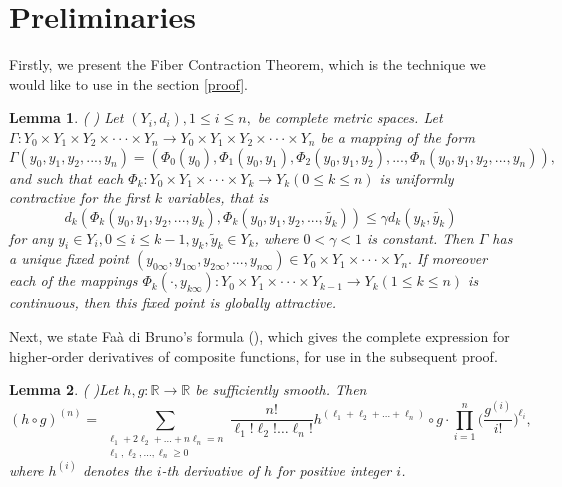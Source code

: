 \documentclass[11pt,reqno,a4paper]{amsart}
\newtheorem{lemma}{Lemma}
\numberwithin{equation}{section}
\begin{document}
\section{Preliminaries}\label{lemma}
Firstly, we present the Fiber Contraction Theorem, which is the technique we would like to use in the section \ref{proof}.




\begin{lemma} ( \!\cite[Fiber Contraction Theorem ]{VA}) \label{fct}
Let $(Y_{i},d_i), 1\le i\le n,$ be complete metric spaces. Let $\Gamma:Y_{0} \times Y_1\times Y_2 \times \cdot\cdot \cdot \times Y_n\rightarrow Y_{0} \times Y_1\times Y_2 \times \cdot\cdot \cdot \times Y_n$ be a mapping of the form 
$$\Gamma(y_0,y_1,y_2,...,y_n)=(\Phi_0(y_0),\Phi_1(y_0,y_1),\Phi_2(y_0,y_1,y_2),...,\Phi_n(y_0,y_1,y_2,...,y_n)), $$ and such that each $\Phi_k: Y_0\times Y_1 \times\cdot\cdot \cdot\times Y_k  \rightarrow Y_k(0\le k \le n)$ is uniformly  contractive for the first $k$ variables, that is
$$d_{k}(\Phi_k(y_0,y_1,y_2,...,y_k),\Phi_k(y_0,y_1,y_2,...,\tilde{y_k})) \le \gamma  d_{k}(y_k,\tilde{y_k})$$ 
for any $y_i \in Y_i, 0\le i\le k-1, y_k,\tilde y_k \in Y_k$, 
where $0<\gamma <1$ is constant. Then $\Gamma$ has a unique fixed point $(y_{0\infty},y_{1\infty},y_{2\infty},...,y_{n\infty}) \in Y_0\times Y_1 \times\cdot\cdot \cdot\times Y_n. $ If moreover each of the mappings $\Phi_k(\cdot, y_{k\infty}):  Y_0\times Y_1 \times\cdot\cdot \cdot\times Y_{k-1} \rightarrow Y_k(1\le k \le n)$ is continuous, then this fixed point is globally attractive.
\end{lemma}
Next, we state Fa\`a di Bruno’s formula (\cite{FF}), which gives the complete expression for higher‑order derivatives of composite functions, for use in the subsequent proof.
\begin{lemma}( \!\cite[Fa\`a di Bruno's Formula]{FF})\label{FDB}
Let $h,g: \mathbb{R}\to \mathbb{R}$ be sufficiently smooth. Then
    $$(h\circ g)^{(n)}=\sum_{\substack{\ell_1+2\ell_2+\dots+n\ell_n=n \\ \ell_1,\ell_2,\dots,\ell_n\ge 0}}\frac{n!}{\ell_1!\ell_2!\dots \ell_n!} h^{(\ell_1+\ell_2+\dots +\ell_n)}\circ g \cdot \prod_{i=1}^n\bigg(\frac{g^{(i)}}{i!}\bigg)^{\ell_i} ,$$
where $h^{(i)}$ denotes the $i$-th derivative of $h$ for positive integer $i$.
\end{lemma}
\end{document}
